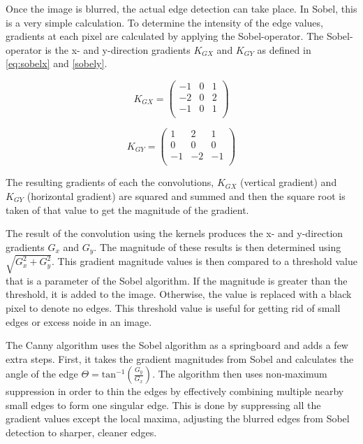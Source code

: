 \documentclass[12pt]{article}
\begin{document}
			Once the image is blurred, the actual edge detection can take place. In Sobel, this is a very simple calculation. To determine the intensity of the edge values, gradients at each pixel are calculated by applying the Sobel-operator. The Sobel-operator is the x- and y-direction gradients $K_{GX}$ and $K_{GY}$ as defined in \eqref{eq:sobelx} and \eqref{sobely}. 

			\begin{equation}
				K_{GX} = 
				\begin{pmatrix}
					\label{eq:sobelx}
					-1	& 0	& 1 \\
					-2	& 0	& 2 \\
					-1	& 0 & 1 \\
				\end{pmatrix}
			\end{equation}

			\begin{equation}
				K_{GY} = 
				\begin{pmatrix}
					\label{eq:sobely}
					1	& 2		& 1 \\
					0	& 0		& 0 \\
					-1	& -2 	& -1 \\
				\end{pmatrix}
			\end{equation}

			The resulting gradients of each the convolutions, $K_{GX}$ (vertical gradient) and $K_{GY}$ (horizontal gradient) are squared and summed and then the square root is taken of that value to get the magnitude of the gradient. 

			The result of the convolution using the kernels produces the x- and y-direction gradients $G_x$ and $G_y$. The magnitude of these results is then determined using $\sqrt{G_{x}^{2} + G_{y}^{2}}$. This gradient magnitude values is then compared to a threshold value that is a parameter of the Sobel algorithm. If the magnitude is greater than the threshold, it is added to the image. Otherwise, the value is replaced with a black pixel to denote no edges. This threshold value is useful for getting rid of small edges or excess noide in an image.

			The Canny algorithm uses the Sobel algorithm as a springboard and adds a few extra steps. First, it takes the gradient magnitudes from Sobel and calculates the angle of the edge $\Theta = \text{tan}^{-1}\left(\frac{G_y}{G_x}\right)$. The algorithm then uses non-maximum suppression in order to thin the edges by effectively combining multiple nearby small edges to form one singular edge. This is done by suppressing all the gradient values except the local maxima, adjusting the blurred edges from Sobel detection to sharper, cleaner edges.
\end{document}

